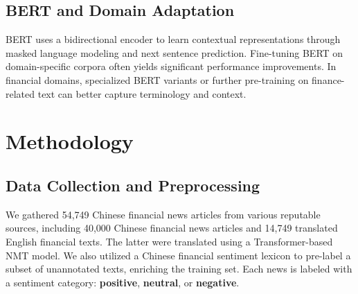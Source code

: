 \documentclass[12pt]{article}
\begin{document}
\subsection{BERT and Domain Adaptation}
BERT \cite{ref2} uses a bidirectional encoder to learn contextual representations through masked language modeling and next sentence prediction. Fine-tuning BERT on domain-specific corpora often yields significant performance improvements. In financial domains, specialized BERT variants or further pre-training on finance-related text can better capture terminology and context.

\section{Methodology}

\subsection{Data Collection and Preprocessing}
We gathered 54,749 Chinese financial news articles from various reputable sources, including 40,000 Chinese financial news articles and 14,749 translated English financial texts. The latter were translated using a Transformer-based NMT model. We also utilized a Chinese financial sentiment lexicon to pre-label a subset of unannotated texts, enriching the training set. Each news is labeled with a sentiment category: \textbf{positive}, \textbf{neutral}, or \textbf{negative}. 
\end{document}
